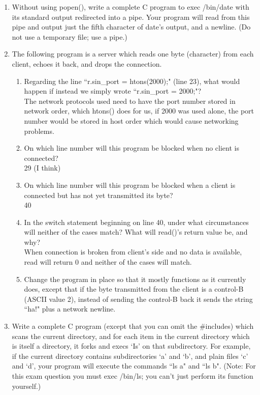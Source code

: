 \documentclass[11pt]{article}
\begin{document}
\begin{enumerate}
			\newpage
			\item Without using popen(), write a complete C program to exec /bin/date with its standard output redirected into a pipe. Your program will read from this pipe and output just the fifth character of date's output, and a newline. (Do not use a temporary file; use a pipe.)
				
			
			\newpage
			\item The following program is a server which reads one byte (character) from each client, echoes it
			back, and drops the connection.
				
			\newpage
			\begin{enumerate}
				\item  Regarding the line ``r.sin\_port = htons(2000);" (line 23), what would happen if instead we simply wrote ``r.sin\_port = 2000;"?\\
					The network protocols used need to have the port number stored in network order, which htons() does for us, if 2000 was used alone, the port number would be stored in host order which would cause networking problems.
				\item On which line number will this program be blocked when no client is connected?\\
					29 (I think)
				\item On which line number will this program be blocked when a client is connected but has not yet transmitted its byte?\\
					40
				\item In the switch statement beginning on line 40, under what circumstances will neither of the cases match? What will read()'s return value be, and why?\\
					When connection is broken from client's side and no data is available, read will return 0 and neither of the cases will match.
				\item Change the program in place so that it mostly functions as it currently does, except that if the byte transmitted from the client is a control-B (ASCII value 2), instead of sending the control-B back it sends the string ``ha!" plus a network newline.
					
			\end{enumerate}
		
		\newpage
		\item Write a complete C program (except that you can omit the \#includes) which scans the current directory, and for each item in the current directory which is itself a directory, it forks and execs `Is' on that subdirectory. For example, if the current directory contains subdirectories `a' and `b', and plain files `c' and `d', your program will execute the commands ``ls a" and ``ls b".
		(Note: For this exam question you must exec /bin/ls; you can't just perform its function yourself.)
			
		

\end{enumerate}
\end{document}
